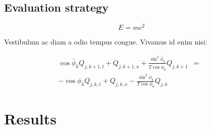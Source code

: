 \documentclass[a0,landscape]{a0poster}
\begin{document}
\begin{multicols}{3}
\subsection*{Evaluation strategy}
\begin{equation}
E = mc^{2}
\label{eqn:Einstein}
\end{equation}


Vestibulum ac diam a odio tempus congue. Vivamus id enim nisi:

\begin{eqnarray}
\cos\bar{\phi}_k Q_{j,k+1,t} + Q_{j,k+1,x}+\frac{\sin^2\bar{\phi}_k}{T\cos\bar{\phi}_k} Q_{j,k+1} &=&\nonumber\\ 
-\cos\phi_k Q_{j,k,t} + Q_{j,k,x}-\frac{\sin^2\phi_k}{T\cos\phi_k} Q_{j,k}\label{edgek}
\end{eqnarray}



\section*{Results}


\end{multicols}
\end{document}
